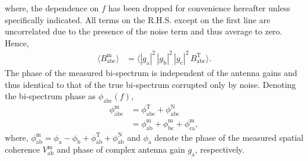 \documentclass[
reprint,
superscriptaddress,
amsmath,
amssymb,
aps,
]{revtex4-1}
\begin{document}
where, the dependence on $f$ has been dropped for convenience hereafter unless specifically indicated. All terms on the R.H.S. except on the first line are uncorrelated due to the presence of the noise term and thus average to zero. Hence, 
\begin{align}
  \langle B_\textrm{abc}^\textrm{m}\rangle &= \langle |g_\textrm{a}|^2\, |g_\textrm{b}|^2\, |g_\textrm{c}|^2\, B_\textrm{abc}^\textrm{T}\rangle. \label{eqn:closure-asymptotic}
\end{align}
The phase of the measured bi-spectrum is independent of the antenna gains and thus identical to that of the true bi-spectrum corrupted only by noise. Denoting the bi-spectrum phase as $\phi_\textrm{abc}(f)$, 
\begin{align}
  \phi_\textrm{abc}^\textrm{m} &= \phi_\textrm{abc}^\textrm{T} + \phi_\textrm{abc}^\textrm{N} \label{eqn:cpphase-sum-sky-noise} \\
  &= \phi_\textrm{ab}^\textrm{m} + \phi_\textrm{bc}^\textrm{m} + \phi_\textrm{ca}^\textrm{m} \label{eqn:cpphase-sum-of-visphases},
\end{align}
where, $\phi_\textrm{ab}^\textrm{m} = \phi_\textrm{a} - \phi_\textrm{b} + \phi_\textrm{ab}^\textrm{T} + \phi_\textrm{ab}^\textrm{N}$ and $\phi_\textrm{a}$ denote the phase of the measured spatial coherence $V_\textrm{ab}^\textrm{m}$ and phase of complex antenna gain $g_\textrm{a}$, respectively. 
\end{document}
